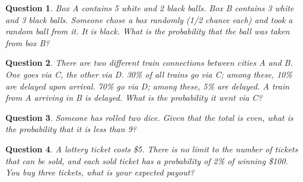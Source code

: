 \documentclass[13pt,a4paper]{article}
\newtheorem{question}{Question}
\begin{document}
\begin{question}
Box A contains 5 white and 2 black balls.   Box B contains 3 white and 3 black balls.  Someone chose a box randomly (1/2 chance each) and took a random ball from it.  It is black.  What is the probability that the ball was taken from box B?
\end{question}
\begin{question}
There are two different train connections between cities A and B.  One goes via C, the other via D.  30\% of all trains go via C; among these, 10\% are delayed upon arrival.  70\% go via D; among these, 5\% are delayed.   A train from A arriving in B is delayed.  What is the probability it went via C?
\end{question}

\begin{question}
Someone has rolled two dice.  Given that the total is even, what is the probability that it is less than 9?
\end{question}


\begin{question}
A lottery ticket costs \$5. 
There is no limit to the number of tickets that can be sold, and each sold ticket has a probability of 2\% of winning \$100.
You buy three tickets, what is your expected payout?
\end{question}

\end{document}

